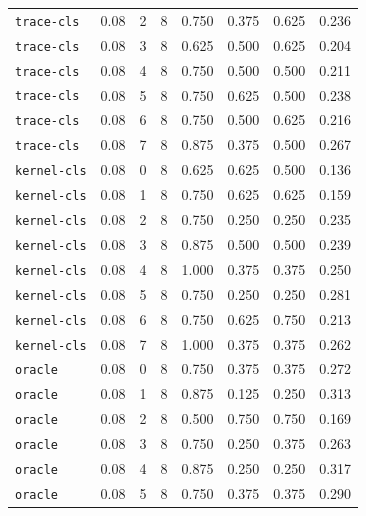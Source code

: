 \documentclass{article}
\begin{document}
\begin{center}
{\begin{tabular}{llllcccc}
\texttt{trace-cls} & 0.08 & 2 & 8 & 0.750 & 0.375 & 0.625 & 0.236 \\
\texttt{trace-cls} & 0.08 & 3 & 8 & 0.625 & 0.500 & 0.625 & 0.204 \\
\texttt{trace-cls} & 0.08 & 4 & 8 & 0.750 & 0.500 & 0.500 & 0.211 \\
\texttt{trace-cls} & 0.08 & 5 & 8 & 0.750 & 0.625 & 0.500 & 0.238 \\
\texttt{trace-cls} & 0.08 & 6 & 8 & 0.750 & 0.500 & 0.625 & 0.216 \\
\texttt{trace-cls} & 0.08 & 7 & 8 & 0.875 & 0.375 & 0.500 & 0.267 \\
\texttt{kernel-cls} & 0.08 & 0 & 8 & 0.625 & 0.625 & 0.500 & 0.136 \\
\texttt{kernel-cls} & 0.08 & 1 & 8 & 0.750 & 0.625 & 0.625 & 0.159 \\
\texttt{kernel-cls} & 0.08 & 2 & 8 & 0.750 & 0.250 & 0.250 & 0.235 \\
\texttt{kernel-cls} & 0.08 & 3 & 8 & 0.875 & 0.500 & 0.500 & 0.239 \\
\texttt{kernel-cls} & 0.08 & 4 & 8 & 1.000 & 0.375 & 0.375 & 0.250 \\
\texttt{kernel-cls} & 0.08 & 5 & 8 & 0.750 & 0.250 & 0.250 & 0.281 \\
\texttt{kernel-cls} & 0.08 & 6 & 8 & 0.750 & 0.625 & 0.750 & 0.213 \\
\texttt{kernel-cls} & 0.08 & 7 & 8 & 1.000 & 0.375 & 0.375 & 0.262 \\
\texttt{oracle} & 0.08 & 0 & 8 & 0.750 & 0.375 & 0.375 & 0.272 \\
\texttt{oracle} & 0.08 & 1 & 8 & 0.875 & 0.125 & 0.250 & 0.313 \\
\texttt{oracle} & 0.08 & 2 & 8 & 0.500 & 0.750 & 0.750 & 0.169 \\
\texttt{oracle} & 0.08 & 3 & 8 & 0.750 & 0.250 & 0.375 & 0.263 \\
\texttt{oracle} & 0.08 & 4 & 8 & 0.875 & 0.250 & 0.250 & 0.317 \\
\texttt{oracle} & 0.08 & 5 & 8 & 0.750 & 0.375 & 0.375 & 0.290 \\
\bottomrule
\end{tabular}%
}
\end{center}
\end{document}
